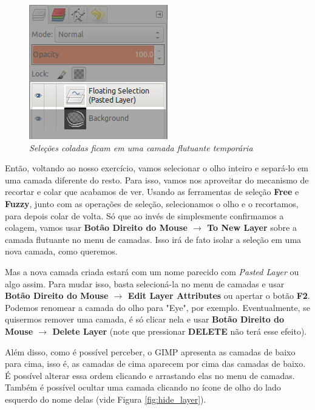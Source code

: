 \documentclass[12pt,onecolumn]{article}
\begin{document}
    \begin{figure}[H]
      \centering
      \includegraphics[width=.5\textwidth]{screenshots/05-pasted_layer.png}
      \caption{
        \footnotesize
        \it
        Seleções coladas ficam em uma camada flutuante temporária
      }
      \label{fig:pasted_layer}
    \end{figure}
    
    Então, voltando ao nosso exercício, vamos selecionar o olho inteiro e
    separá-lo em uma camada diferente do resto. Para isso, vamos nos aproveitar
    do mecanismo de recortar e colar que acabamos de ver. Usando as ferramentas
    de seleção {\bf Free} e {\bf Fuzzy}, junto com as operações de seleção,
    selecionamos o olho e o recortamos, para depois colar de volta. Só que ao
    invés de simplesmente confirmamos a colagem, vamos usar {\bf Botão Direito
    do Mouse $\rightarrow$ To New Layer} sobre a camada flutuante no menu de
    camadas. Isso irá de fato isolar a seleção em uma nova camada, como
    queremos.
    
    Mas a nova camada criada estará com um nome parecido com {\it Pasted Layer}
    ou algo assim. Para mudar isso, basta selecioná-la no menu de camadas e usar
    {\bf Botão Direito do Mouse $\rightarrow$ Edit Layer Attributes} ou apertar
    o botão {\bf F2}. Podemos renomear a camada do olho para "Eye", por exemplo.
    Eventualmente, se quisermos remover uma camada, é só clicar nela e usar
    {\bf Botão Direito do Mouse $\rightarrow$ Delete Layer} (note que pressionar
    {\bf DELETE} não terá esse efeito).
    
    Além disso, como é possível perceber, o GIMP apresenta as camadas de baixo
    para cima, isso é, as camadas de cima aparecem por cima das camadas de
    baixo. É possível alterar essa ordem clicando e arrastando elas no menu de
    camadas. Também é possível ocultar uma camada clicando no ícone de olho do
    lado esquerdo do nome delas (vide Figura \ref{fig:hide_layer}).
    
\end{document}
